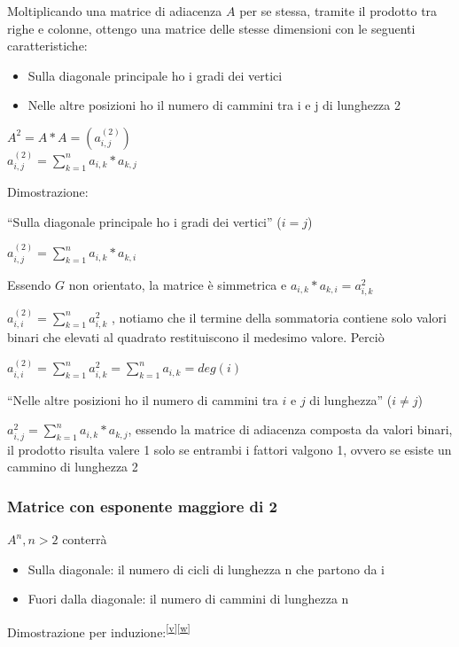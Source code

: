 \documentclass[11pt,a4paper,twoside,openright]{book}
\providecommand{\tightlist}{\setlength{\itemsep}{0pt}\setlength{\parskip}{0pt}}
\begin{document}
{{{Moltiplicando una matrice di adiacenza $A$ per se stessa, tramite il prodotto tra righe e colonne, ottengo una matrice delle stesse dimensioni con le seguenti caratteristiche:}

\begin{itemize}
\tightlist
\item
  {Sulla diagonale principale ho i gradi dei vertici}
\item
  {Nelle altre posizioni ho il numero di cammini tra i e j di lunghezza
  2}
\end{itemize}

$A^2 = A*A = (a^{(2)}_{i,j})$ \\
$a^{(2)}_{i,j}=\sum_{k=1}^{n}{a_{i,k}*a_{k,j}}$

{Dimostrazione:}

{``Sulla diagonale principale ho i gradi dei vertici'' ($i=j$)}

$a^{(2)}_{i,j}=\sum_{k=1}^{n}{a_{i,k}*a_{k,i}}$

{Essendo $G$ non orientato, la matrice è simmetrica e $a_{i,k}*a_{k,i} = a^2_{i,k}$}

{$a^{(2)}_{i,i} = \sum^n_{k=1}{a^2_{i,k}}$ , notiamo che il termine della sommatoria contiene solo valori binari che elevati al quadrato restituiscono il medesimo valore. Perciò}

$a^{(2)}_{i,i} = \sum^n_{k=1}{a^2_{i,k}} = \sum^n_{k=1}{a_{i,k}} = deg(i)$

{``Nelle altre posizioni ho il numero di cammini tra $i$ e $j$ di lunghezza'' ($i\neq j$)}

{$a^2_{i,j}=\sum_{k=1}^{n}{a_{i,k}*a_{k,j}}$, essendo la matrice di adiacenza composta da valori binari, il prodotto risulta valere 1 solo se entrambi i fattori valgono 1, ovvero se esiste un cammino di lunghezza 2}

\subsubsection{Matrice con esponente maggiore di 2}

{$A^n, n > 2$ conterrà}

\begin{itemize}
\tightlist
\item
  {Sulla diagonale: il numero di cicli di lunghezza n che partono da i}
\item
  {Fuori dalla diagonale: il numero di cammini di lunghezza n}
\end{itemize}

{Dimostrazione per induzione:}\textsuperscript{\protect\hyperlink{cmnt22}{{[}v{]}}\protect\hyperlink{cmnt23}{{[}w{]}}}

}}
\end{document}
